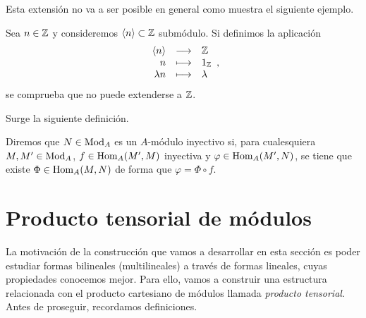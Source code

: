 \documentclass[../main.tex]{subfiles}
\begin{document}
Esta extensión no va a ser posible en general como muestra el siguiente ejemplo.
\begin{example}
	Sea $n\in\mathbb{Z}$ y consideremos $\langle n\rangle\subset\mathbb{Z}$ submódulo. Si definimos la aplicación
	$$\begin{array}{rcl}
	\langle n\rangle&\longrightarrow&\mathbb{Z}\\
	n&\longmapsto&1_{\mathbb{Z}}\\
	\lambda n&\longmapsto&\lambda
	\end{array},$$
	se comprueba que no puede extenderse a $\mathbb{Z}$.
\end{example}

Surge la siguiente definición.

\begin{definition}
    Diremos que $N\in\operatorname{Mod}_A$ es un $A$-módulo inyectivo si, para cualesquiera $M,M'\in\operatorname{Mod}_A$, $f\in\operatorname{Hom}_A(M',M)$ inyectiva y $\varphi\in\operatorname{Hom}_A(M',N)$, se tiene que existe $\Phi\in\operatorname{Hom}_A(M,N)$ de forma que $\varphi=\Phi\circ f$.
\end{definition}

\section{Producto tensorial de módulos}

La motivación de la construcción que vamos a desarrollar en esta sección es poder estudiar formas bilineales (multilineales) a través de formas lineales, cuyas propiedades conocemos mejor. Para ello, vamos a construir una estructura relacionada con el producto cartesiano de módulos llamada \emph{producto tensorial}. Antes de proseguir, recordamos definiciones.
\end{document}
